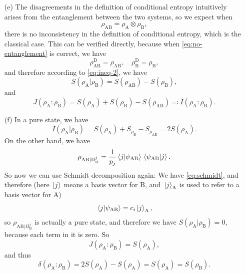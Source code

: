 \documentclass[hyperref, a4paper]{article}
\begin{document}
\begin{itemize}
\item[(e)] The disagreements in the definition of conditional entropy 
intuitively arises from the entanglement between the two systems,
so we expect when 
\begin{equation}
    \rho_{\text{AB}} = \rho_{\text{A}} \otimes \rho_{\text{B}},
    \label{eq:no-entanglement}
\end{equation}
there is no inconsistency in the definition of conditional entropy,
which is the classical case.
This can be verified directly, because when \eqref{eq:no-entanglement} is correct,
we have 
\[
    \rho^\text{D}_{\text{AB}} = \rho_{\text{AB}}, \quad 
    \rho^\text{D}_{\text{B}} = \rho_{\text{B}},
\]
and therefore according to \eqref{eq:ineq-2}, 
we have 
\begin{equation}
    S(\rho_{\text{A}} | \rho_{\text{B}}) = S(\rho_{\text{AB}}) - S(\rho_{\text{B}}),
\end{equation}
and 
\begin{equation}
    J(\rho_{\text{A}} : \rho_{\text{B}}) = 
    S(\rho_{\text{A}}) + S(\rho_{\text{B}}) - S(\rho_{\text{AB}}) 
    \eqqcolon I(\rho_{\text{A}} : \rho_{\text{B}}).
\end{equation}

\item[(f)] In a pure state, we have 
\begin{equation}
    I(\rho_{\text{A}} | \rho_{\text{B}}) = S(\rho_{\text{A}}) + S_{\rho_{\text{B}}} - S_{\rho_{\text{AB}}}
    = 2 S(\rho_{\text{A}}).
\end{equation}
On the other hand, we have 
\begin{equation}
    \rho_{\text{AB} | \Pi^j_{\text{B}}} = \frac{1}{p_j} \braket*{j}{\psi_{\text{AB}}} \braket*{\psi_{\text{AB}}}{j}.
\end{equation}
So now we can use Schmidt decomposition again:
We have \eqref{eq:schmidt},
and therefore (here $\ket*{j}$ means a basis vector for B, 
and $\ket*{j}_{\text{A}}$ is used to refer to a basis vector for A)
\[
    \braket*{j}{\psi_{\text{AB}}} = c_i \ket*{j}_{\text{A}},
\]
so $\rho_{\text{AB} | \Pi_\text{B}^j}$ is actually a pure state, 
and therefore we have $S(\rho_{\text{A}} | \rho_{\text{B}}) = 0$,
because each term in it is zero.
So 
\begin{equation}
    J(\rho_{\text{A}} : \rho_{\text{B}}) = S(\rho_{\text{A}}),
\end{equation}
and thus 
\begin{equation}
    \delta(\rho_{\text{A}} : \rho_{\text{B}}) = 2 S(\rho_{\text{A}}) - S(\rho_{\text{A}}) = 
    S(\rho_{\text{A}}) = S(\rho_{\text{B}}).
\end{equation}

\end{itemize}
\end{document}

